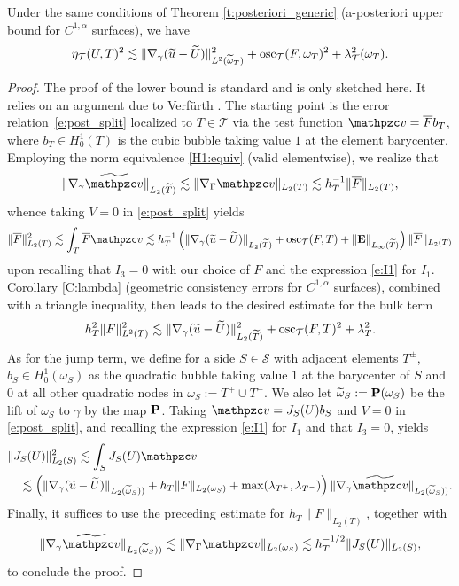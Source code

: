 \begin{theorem}\label{T:apost-lower}
Under the same conditions of Theorem \ref{t:posteriori_generic} (a-posteriori
upper bound for $C^{1,\alpha}$ surfaces), we have
%
\[
\eta_{\mathcal{T}}(U,T)^2 \lesssim \| \nabla_\gamma (\widetilde u- \widetilde U) \|_{L^2(\widetilde{\omega}_T)}^2
+ \operatorname{osc}_{\mathcal{T}}(F,\omega_T)^2 + \lambda^2_{\mathcal{T}}(\omega_T).
\]
\end{theorem}  
%
\begin{proof}
The proof of the lower bound is standard and is only sketched here.
It relies on an argument due to Verf\"urth \cite{MR3059294}.
The starting point is the error relation~\eqref{e:post_split} localized to $T\in \mathcal T$ via the test function $\tv = \overline{F} b_T$, where $b_T \in H^1_0(T)$ is the cubic bubble taking value $1$ at the element barycenter. Employing the norm equivalence \eqref{H1:equiv} (valid elementwise), we realize that
$$
\| \nabla_\gamma \ttv \|_{L_2(\widetilde{T})} \lesssim \| \nabla_\Gamma \tv \|_{L_2(T)} \lesssim h_T^{-1} \| \overline{F}\|_{L_2(T)},
$$
whence taking  $V=0$  in \eqref{e:post_split} yields
$$
\| \overline{F} \|_{L_2(T)}^2 \lesssim \int_T \overline{F} \tv \lesssim h_T^{-1} \left( \| \nabla_\gamma (\wu - \widetilde U)\|_{L_2(\widetilde T)} + \osc_\T(F,T) + \|\bE\|_{L_\infty(\widetilde T)} \right) \| \overline{F}\|_{L_2(T)}
$$
upon recalling that $I_3=0$ with our choice of $F$ and the expression \eqref{e:I1} for $I_1$.
Corollary \ref{C:lambda} (geometric consistency errors for $C^{1,\alpha}$ surfaces),
combined with a triangle inequality, then leads to the desired estimate for the bulk term
$$
h_T^2\| F \|_{L^2(T)}^2 \lesssim \| \nabla_\gamma (\widetilde{u} - \widetilde U)\|_{L_2(\widetilde T)}^2 + \mathrm{osc}_{\mathcal{T}}(F,T)^2 + \lambda_T^2. 
$$
%
As for the jump term, we define for a side $S \in \mathcal S$ with adjacent elements $T^\pm$,  $b_S \in H^1_0(\omega_S)$ as the  quadratic bubble taking value $1$ at the barycenter of $S$ and $0$ at all other quadratic nodes in $\omega_S:= T^+\cup T^-$.
We also let $\widetilde{\omega}_S:= {\bf P}(\omega_S)$ be the lift of $\omega_S$ to
$\gamma$ by the map ${\bf P}$.
Taking $\tv=J_S(U) b_S$ and $V=0$ in \eqref{e:post_split}, and recalling the expression \eqref{e:I1} for $I_1$ and that $I_3=0$, yields
%
\begin{align*}
&\| J_S(U)\|_{L_2(S)}^2  \lesssim \int_S J_S(U)\tv \\
&\quad \lesssim  \left( \| \nabla_\gamma (\widetilde u - \widetilde U)\|_{L_2(\widetilde{\omega}_S))} + h_T \| F\|_{L_2(\omega_S)} + \max(\lambda_{T^+},\lambda_{T^-}) \right) \| \nabla_\gamma \ttv\|_{L_2(\widetilde{\omega}_S))}.
\end{align*}
Finally, it suffices to use the preceding estimate for $h_T \| F\|_{L_2(T)}$,
together with 
$$
\| \nabla_\gamma \ttv\|_{L_2(\widetilde{\omega}_S))} \lesssim \| \nabla_\Gamma \tv\|_{L_2(\omega_S)} \lesssim h_T^{-1/2} \| J_S(U)\|_{L_2(S)},
$$
%
to conclude the proof.
\end{proof}  

